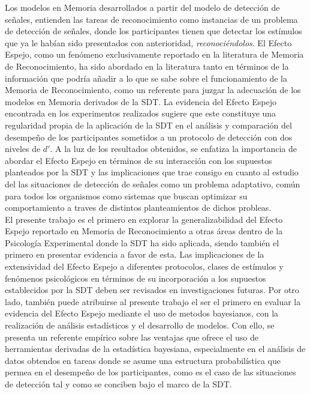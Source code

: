 Los modelos en Memoria desarrollados a partir del modelo de detección de señales, entienden las tareas de reconocimiento como instancias de un problema de detección de señales, donde los participantes tienen que detectar los estímulos que ya le habían sido presentados con anterioridad, \textit{reconociéndolos}. El Efecto Espejo, como un fenómeno exclusivamente reportado en la literatura de Memoria de Reconocimiento, ha sido abordado en la literatura tanto en términos de la  información que podría añadir a lo que se sabe sobre el funcionamiento de la Memoria de Reconocimiento, como un referente para juzgar la adecuación de los modelos en Memoria derivados de la SDT. La evidencia del Efecto Espejo encontrada en los experimentos realizados sugiere que este constituye una regularidad propia de la aplicación de la SDT en el análisis y comparación del desempeño de los participantes sometidos a un protocolo de detección con dos niveles de $d'$. A la luz de los resultados obtenidos, se enfatiza la importancia de abordar el Efecto Espejo en términos de su interacción con los supuestos planteados por la SDT y las implicaciones que trae consigo en cuanto al estudio del las situaciones de detección de señales como un problema adaptativo, común para todos los organismos como sistemas que buscan optimizar su comportamiento a traves de distintos planteamientos de dichos probleas.\\

El presente trabajo es el primero en explorar la generalizabilidad del Efecto Espejo reportado en Memoria de Reconocimiento a otras áreas dentro de la Psicología Experimental donde la SDT ha sido aplicada, siendo también el primero en presentar evidencia a favor de esta. Las implicaciones de la extensividad del Efecto Espejo a diferentes protocolos, clases de estímulos y fenómenos psicológicos en términos de su incorporación a los supuestos establecidos por la SDT deben ser revisados en investigaciones futuras. Por otro lado, también puede atribuirse al presente trabajo el ser el primero en evaluar la evidencia del Efecto Espejo mediante el uso de metodos bayesianos, con la realización de análisis estadísticos y el desarrollo de modelos. Con ello, se presenta un referente empírico sobre las ventajas que ofrece el uso de herramientas derivadas de la estadística bayesiana, especialmente en el análisis de datos obtendos en tareas donde se asume una estructura probabilística que permea en el desempeño de los participantes, como es el caso de las situaciones de detección tal y como se conciben bajo el marco de la SDT.\\










